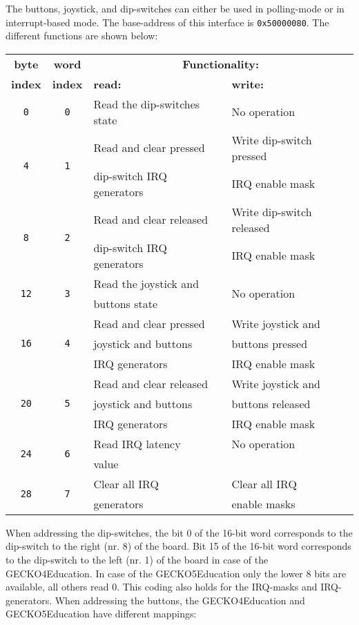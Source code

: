 \documentclass[a4paper,twoside,12pt]{article}
\begin{document}
The buttons, joystick, and dip-switches can either be used in polling-mode or in interrupt-based mode. The base-address of this interface is \texttt{0x50000080}. The different functions are shown below:
\begin{center}
\begin{tabular}{|c|c|l|l|}
\hline
\textbf{byte}&\textbf{word}&\multicolumn{2}{|c|}{\textbf{Functionality:}}\\
\cline{3-4}
\textbf{index}&\textbf{index}&\textbf{read:}&\textbf{write:}\\
\hline
\hline
\texttt{0}&\texttt{0}&Read the dip-switches state&No operation\\
\hline
\multirow{2}{*}{\texttt{4}}&\multirow{2}{*}{\texttt{1}}&Read and clear pressed&Write dip-switch pressed\\
&&dip-switch IRQ generators&IRQ enable mask\\
\hline
\multirow{2}{*}{\texttt{8}}&\multirow{2}{*}{\texttt{2}}&Read and clear released&Write dip-switch released\\
&&dip-switch IRQ generators&IRQ enable mask\\
\hline
\multirow{2}{*}{\texttt{12}}&\multirow{2}{*}{\texttt{3}}&Read the joystick and&\multirow{2}{*}{No operation}\\
&&buttons state&\\
\hline
\multirow{3}{*}{\texttt{16}}&\multirow{3}{*}{\texttt{4}}&Read and clear pressed&Write joystick and\\
&&joystick and buttons&buttons pressed\\
&&IRQ generators&IRQ enable mask\\
\hline
\multirow{3}{*}{\texttt{20}}&\multirow{3}{*}{\texttt{5}}&Read and clear released&Write joystick and\\
&&joystick and buttons&buttons released\\
&&IRQ generators&IRQ enable mask\\
\hline
\multirow{2}{*}{\texttt{24}}&\multirow{2}{*}{\texttt{6}}&Read IRQ latency&No operation\\
&&value&\\
\hline
\multirow{2}{*}{\texttt{28}}&\multirow{2}{*}{\texttt{7}}&Clear all IRQ&Clear all IRQ\\
&&generators&enable masks\\
\hline
\end{tabular}
\end{center}
When addressing the dip-switches, the bit 0 of the 16-bit word corresponds to the dip-switch to the right (nr. 8) of the board. Bit 15 of the 16-bit word corresponds to the dip-switch to the left (nr. 1) of the board in case of the GECKO4Education. In case of the GECKO5Education only the lower 8 bits are available, all others read 0. This coding also holds for the IRQ-masks and IRQ-generators. When addressing the buttons, the GECKO4Education and GECKO5Education have different mappings:
\end{document}
